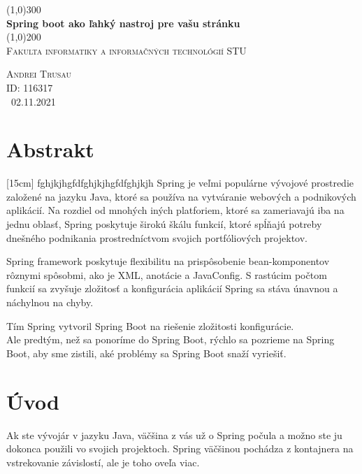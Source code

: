 \documentclass[12pt, letterpaper]{article}
\begin{document}
\begin{titlepage}
	\begin{center}	
	\line(1,0){300} \\
	[0.25in]
	\huge{\bfseries \huge Spring boot ako ľahký nastroj pre vašu stránku} \\
	[2mm]
	\line(1,0){200} \\
	[0.5cm]
	\textsc{\LARGE Fakulta informatiky a informačných technológií STU} \\
	[7cm]
	\end{center}
	\begin{flushright}
	\textsc{\large Andrei Trusau \\
	ID: 116317 \\
	\ 02.11.2021 \\}
	\end{flushright}
\end{titlepage}

\section{Abstrakt}\label{sec:intro}[15cm]
fghjkjhgfdfghjkjhgfdfghjkjh
Spring je veľmi populárne vývojové prostredie založené na jazyku Java, ktoré sa používa na vytváranie webových a podnikových aplikácií. Na rozdiel od mnohých iných platforiem, ktoré sa zameriavajú iba na jednu oblasť, Spring poskytuje širokú škálu funkcií, ktoré spĺňajú potreby dnešného podnikania prostredníctvom svojich portfóliových projektov.

Spring framework poskytuje flexibilitu na prispôsobenie bean-komponentov rôznymi spôsobmi, ako je XML, anotácie a JavaConfig. S rastúcim počtom funkcií sa zvyšuje zložitosť a konfigurácia aplikácií Spring sa stáva únavnou a náchylnou na chyby.

Tím Spring vytvoril Spring Boot na riešenie zložitosti konfigurácie. \\

Ale predtým, než sa ponoríme do Spring Boot, rýchlo sa pozrieme na Spring Boot, aby sme zistili, aké problémy sa Spring Boot snaží vyriešiť.\\
[15cm]
\section{Úvod}
Ak ste vývojár v jazyku Java, väčšina z vás už o Spring počula a možno ste ju dokonca použili vo svojich projektoch. Spring väčšinou pochádza z kontajnera na vstrekovanie závislostí, ale je toho oveľa viac.
\end{document}
